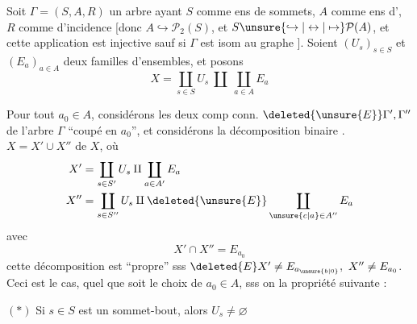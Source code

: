Soit  $\Gamma=(S,A,R)$ un arbre ayant $S$ comme ens de sommets, $A$ \unsure{-} comme ens d', $R$ comme  d'incidence [donc $A\hookrightarrow\mathcal{P}_2(S)$, et $S\unsure{\hookrightarrow|\leftrightarrow|\mapsto}\mathcal{P}(A)$, et cette application est injective sauf si $\Gamma$ est isom au graphe
\diagram{\begin{tikzcd}[ampersand replacement=\&,column sep=1.4em]
\bullet \arrow[r,dash] \& \bullet
\end{tikzcd}}
]. Soient $(U_s)_{s\in S}$ et $(E_a)_{a\in A}$ deux familles d'ensembles, et posons
\[
X=\coprod_{s\in S}U_s\ \amalg\ \coprod_{a\in A}E_a
\]

Pour tout $a_0\in A$, considérons les deux comp conn. $\deleted{\unsure{E}}\Gamma',\Gamma''$ de l'arbre $\Gamma$ ``coupé en $a_0$'', et considérons la décomposition binaire . $X=X'\cup X''$ de $X$,
où
\[
\begin{aligned}
X'&=\coprod_{s\in S'}U_s\amalg\coprod_{a\in A'}E_a\\
X''&=\coprod_{s\in S''}U_s\amalg\deleted{\unsure{E}}\coprod_{\unsure{c|a}\in A''}E_a
\end{aligned}
\]
avec
\[
X'\cap X''=E_{a_0}
\]
cette décomposition est ``propre'' sss $\deleted{E}X'\ne E_{a_{\unsure{b|0}}},\ X''\ne E_{a_0}$. Ceci est le cas, quel que soit le choix de $a_0\in A$, sss on  la propriété suivante :

$(\ast)$ Si $s\in S$ est un sommet-bout, alors $U_s\ne\varnothing$
